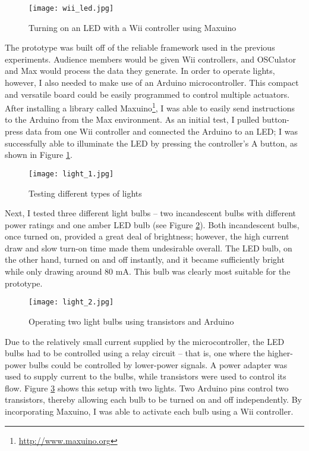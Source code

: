 \begin{figure}
	\centering

	\texttt{[image: wii\_led.jpg]}
	\caption{Turning on an LED with a Wii controller using Maxuino}

	\label{prototyping3.1}
\end{figure}

The prototype was built off of the reliable framework used in the previous experiments. Audience members would be given Wii controllers, and OSCulator and Max would process the data they generate. In order to operate lights, however, I also needed to make use of an Arduino microcontroller. This compact and versatile board could be easily programmed to control multiple actuators. After installing a library called Maxuino\footnote{\url{http://www.maxuino.org}}, I was able to easily send instructions to the Arduino from the Max environment. As an initial test, I pulled button-press data from one Wii controller and connected the Arduino to an LED; I was successfully able to illuminate the LED by pressing the controller's A button, as shown in Figure \ref{prototyping3.1}.

\begin{figure}
	\centering

	\texttt{[image: light\_1.jpg]}
	\caption{Testing different types of lights}

	\label{prototyping3.2}
\end{figure}

Next, I tested three different light bulbs -- two incandescent bulbs with different power ratings and one amber LED bulb (see Figure \ref{prototyping3.2}). Both incandescent bulbs, once turned on, provided a great deal of brightness; however, the high current draw and slow turn-on time made them undesirable overall. The LED bulb, on the other hand, turned on and off instantly, and it became sufficiently bright while only drawing around 80 mA. This bulb was clearly most suitable for the prototype.

\begin{figure}
	\centering

	\texttt{[image: light\_2.jpg]}
	\caption{Operating two light bulbs using transistors and Arduino}

	\label{prototyping3.3}
\end{figure}

Due to the relatively small current supplied by the microcontroller, the LED bulbs had to be controlled using a relay circuit -- that is, one where the higher-power bulbs could be controlled by lower-power signals. A power adapter was used to supply current to the bulbs, while transistors were used to control its flow. Figure \ref{prototyping3.3} shows this setup with two lights. Two Arduino pins control two transistors, thereby allowing each bulb to be turned on and off independently. By incorporating Maxuino, I was able to activate each bulb using a Wii controller.

